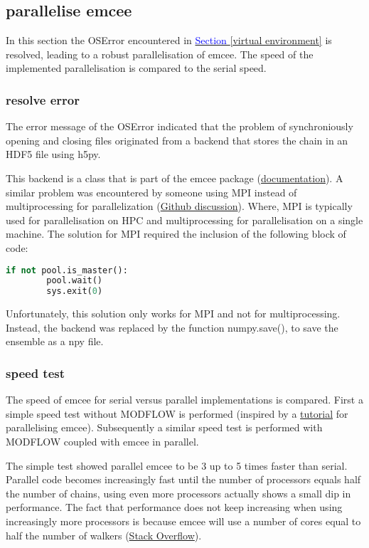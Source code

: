 \subsection{parallelise emcee}\label{par emcee}
In this section the OSError encountered in \hyperref[virtual environment]{\textcolor{blue}{Section }\ref{virtual environment}} is resolved, leading to a robust parallelisation of emcee. The speed of the implemented parallelisation is compared to the serial speed. 

\subsubsection{resolve error}
The error message of the OSError indicated that the problem of synchroniously opening and closing files originated from a backend that stores the chain in an HDF5 file using h5py. 

This backend is a class that is part of the emcee package (\href{https://emcee.readthedocs.io/en/stable/user/backends/#emcee.backends.HDFBackend}{documentation}). A similar problem was encountered by someone using MPI instead of multiprocessing for parallelization (\href{https://github.com/dfm/emcee/issues/389}{Github discussion}). Where, MPI is typically used for parallelisation on HPC and multiprocessing for parallelisation on a single machine. The solution for MPI required the inclusion of the following block of code:
\begin{lstlisting}[language=python]
    if not pool.is_master():
        pool.wait()
        sys.exit(0)
\end{lstlisting}

Unfortunately, this solution only works for MPI and not for multiprocessing. Instead, the backend was replaced by the function numpy.save(), to save the ensemble as a npy file. 

\subsubsection{speed test}
The speed of emcee for serial versus parallel implementations is compared. First a simple speed test without MODFLOW is performed (inspired by a \href{https://emcee.readthedocs.io/en/stable/tutorials/parallel/}{tutorial} for parallelising emcee). Subsequently a similar speed test is performed with MODFLOW coupled with emcee in parallel.

The simple test showed parallel emcee to be 3 up to 5 times faster than serial. Parallel code becomes increasingly fast until the number of processors equals half the number of chains, using even more processors actually shows a small dip in performance. The fact that performance does not keep increasing when using increasingly more processors is because emcee will use a number of cores equal to half the number of walkers (\href{https://stackoverflow.com/questions/69234421/multiprocessing-the-python-module-emcee-but-not-all-available-cores-on-the-ma}{Stack Overflow}).

